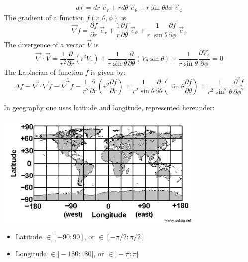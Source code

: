 \begin{equation}
d\vec{r} = dr \; \vec{e}_r + r d\theta \; \vec{e}_\theta + r \sin\theta d\phi \; \vec{e}_\phi
\end{equation}
The gradient of a function $f(r,\theta,\phi)$ is 
\begin{equation}
\vec\nabla f= \frac{\partial f}{\partial r} \; \vec{e}_r
+ \frac{1}{r} \frac{\partial f}{\partial \theta} \; \vec{e}_\theta 
+ \frac{1}{r \; \sin\theta} \frac{\partial f}{\partial \phi} \;  \vec{e}_\phi
\end{equation}
The divergence of a vector $\vec{V}$ is
\begin{equation}
\vec\nabla\cdot \vec{V}=
\frac{1}{r^2} \frac{\partial}{\partial r} \left(r^2 V_r \right) 
+
\frac{1}{r \sin\theta} \frac{\partial}{\partial \theta} (V_\theta \sin\theta)
+
\frac{1}{r \sin\theta} \frac{\partial V_\phi}{\partial \phi}=0
\label{eq:divsc}
\end{equation}
The Laplacian of function $f$ is given by: 
\begin{equation}
\Delta f= \vec\nabla \cdot\vec\nabla f= \vec\nabla^2 f
=
\frac{1}{r^2}\frac{\partial}{\partial r} \left( r^2 \frac{\partial f}{\partial r} \right)
+\frac{1}{r^2 \sin\theta} \frac{\partial}{\partial \theta} \left( \sin\theta \frac{\partial f}{\partial \theta} \right)
+\frac{1}{r^2 \sin^2\theta}  \frac{\partial^2 f}{\partial \phi^2}
\end{equation}

In geography one uses latitude and longitude, represented hereunder:
\begin{center}
\includegraphics[width=10cm]{images/map.jpg}
\end{center}
\begin{itemize}
\item Latitude  $\in[-90:90]$,   or $\in[-\pi/2:\pi/2]$ 
\item Longitude $\in]-180:180]$, or $\in]-\pi:\pi]$ 
\end{itemize}

